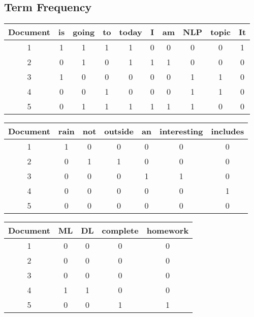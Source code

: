 \subsection{Term Frequency}
\begin{center}
{\small
\begin{tabular}{|| c ||c c c c c c c c c ||} 
	\hline
Document 	 & is &	going &	to &	today &	I &	am &	NLP &	topic &	It 		\\
\hline
\hline
	1 &	1 &	1 &	1 &	1 &	0 &	0 &	0 &	0 &	1	\\
	2& 0& 1& 0& 1& 1& 1& 0& 0& 0\\
	3& 1& 0& 0& 0& 0& 0& 1& 1& 0\\
	4& 0& 0& 1& 0& 0& 0& 1& 1& 0\\
	5& 0& 1& 1& 1& 1& 1& 1& 0& 0\\
\hline
\end{tabular}

\begin{tabular}{|| c|| c c c c c c ||}
\hline
Document &rain &not &outside &an &interesting &	includes  \\
\hline
\hline
	1 &	1 & 0 &	0 &	0 &	0 &	0 	\\
	2& 0& 1& 1& 0& 0& 0\\
	3& 0& 0& 0& 1& 1& 0\\
	4& 0& 0& 0& 0& 0& 1\\
	5& 0& 0& 0& 0& 0& 0\\
\hline
\end{tabular}

\begin{tabular}{|| c|| c c c c ||}
\hline
Document &ML&DL &complete &homework\\
\hline
\hline
1	 &	0 &	0 &	0 &	0 	\\
	2& 0& 0& 0& 0 \\
	3& 0& 0& 0& 0 \\
	4& 1& 1& 0& 0\\
	5& 0& 0& 1& 1\\
\hline
\end{tabular}
}
\end{center}
